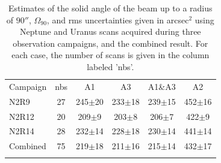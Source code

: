 \begin{table}[!h]
\caption{Estimates of the solid angle of the beam up to a radius of
{\rev $90''$, $\Omega_{90}$}, and rms uncertainties given in
arcsec$^{2}$ using Neptune and Uranus scans acquired during three
observation campaigns, and the combined result. For each case, the
number of scans is given in the column labeled 'nbs'.}
\label{tab:solid}
\centering
\begin{tabular}{l ccccc}
\hline\hline
\noalign{\smallskip}
Campaign  & nbs %
& A1 & A3 & A1\&A3 & A2 \\
\noalign{\smallskip}
\hline
\noalign{\smallskip}
N2R9      & 27  &  245$\pm$20    &  233$\pm$18  & 239$\pm$15  & 452$\pm$16 \\
N2R12     & 20  &  209$\pm$9    &  203$\pm$8 &  206$\pm$7   & 422$\pm$9 \\
N2R14     & 28  &  232$\pm$14    &  228$\pm$18 & 230$\pm$14 & 441$\pm$14 \\
Combined  & 75  &  219$\pm$18    &  211$\pm$16 & 215$\pm$14    &  432$\pm$17 \\
\noalign{\smallskip}
\hline
\end{tabular}
\end{table}

%



